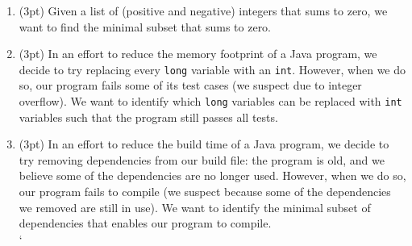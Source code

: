 \documentclass{report}
\newif\ifkey
\newcommand{\answerlong}[1]{\ifkey\color{red}\textbf{#1}\color{black}\else\vspace{0.5in}\fi\xspace}
\newcommand*{\pts}[1]{\addtocounter{points}{#1}(#1pt)}
\begin{document}
\begin{spacing}{1.4}
\begin{enumerate}[leftmargin=*]
\begin{enumerate}
    \item \pts{3} Given a list of (positive and negative) integers that sums to zero, we want to find the minimal subset that sums to zero.\\
      \answerlong{Delta debugging is not suitable for this use case: integer summation is ambiguous.}
      \vspace{0.25in}
    \item \pts{3} In an effort to reduce the memory footprint of a Java program, we decide to try replacing
      every \lstinline{long} variable with an \lstinline{int}. However, when we do so, our program fails some of its test cases (we suspect due to integer overflow). We want to
      identify which \lstinline{long} variables can be replaced with \lstinline{int} variables such that the program still passes all tests.\\
      \answerlong{Delta debugging is suitable for this use case. We can define script is_interesting.sh such that it takes a
        list of occurrences of long and replaces each with an int. The script exits 1 if the code compiles and runs the tests
        successfully, and it exits 0 if the code doesn't compile or fails any tests.}
      \vspace{0.25in}
    \item \pts{3} In an effort to reduce the build time of a Java program, we decide to try removing
      dependencies from our build file: the program is old, and we believe some of the dependencies are no longer used.
      However, when we do so, our program fails to compile (we suspect because some of the dependencies we removed are
      still in use). We want to identify the minimal subset of dependencies that enables our program to compile.\\
      \answerlong{Delta debugging is suitable for this use case. We can define script is_interesting.sh such that it takes a list of
        dependencies, removes them from the build file, and then attempts to compile the program. The script exits 1 if the code compiles
        successfully, and 0 if it does not.}
            \vspace{0.25in}
`     \end{enumerate}



\end{enumerate}
\end{spacing}
\end{document}
